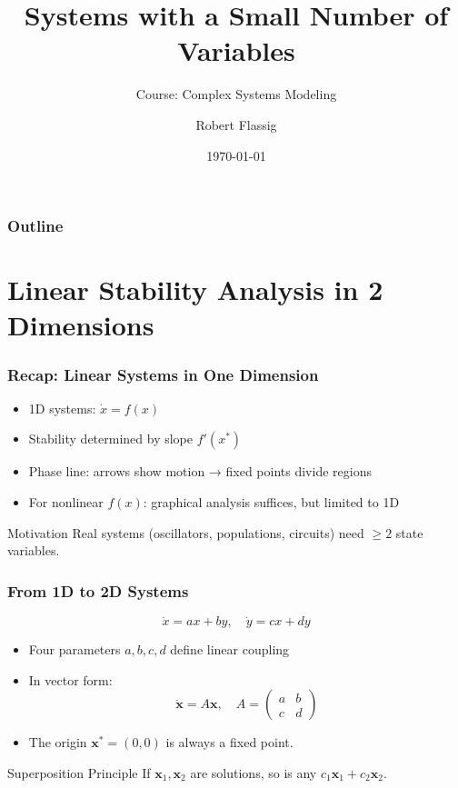 \documentclass{beamer}
\title{Systems with a Small Number of
Variables}
\subtitle{Course: Complex Systems Modeling}
\author{Robert Flassig}
\institute{Brandenburg University of Applied Sciences}
\date{\today}
\begin{document}
\begin{frame}
\titlepage
\end{frame}

\begin{frame}
\frametitle{Outline}
\tableofcontents
\end{frame}

\section{Linear Stability Analysis in 2 Dimensions}

\begin{frame}
  \frametitle{Recap: Linear Systems in One Dimension}
  \begin{itemize}
    \item 1D systems: \(\dot{x} = f(x)\)
    \item Stability determined by slope \(f'(x^*)\)
    \item Phase line: arrows show motion → fixed points divide regions
    \item For nonlinear \(f(x)\): graphical analysis suffices, but limited to 1D
  \end{itemize}
  \begin{block}{Motivation}
    Real systems (oscillators, populations, circuits) need \(\ge 2\) state variables.
  \end{block}
\end{frame}

\begin{frame}
  \frametitle{From 1D to 2D Systems}
  \[
  \dot{x} = a x + b y,\quad \dot{y} = c x + d y
  \]
  \begin{itemize}
    \item Four parameters \(a,b,c,d\) define linear coupling
    \item In vector form:
    \[
    \dot{\mathbf{x}} = A \mathbf{x}, \quad
    A = \begin{pmatrix} a & b \\ c & d \end{pmatrix}
    \]
    \item The origin \(\mathbf{x}^* = (0,0)\) is always a fixed point.
  \end{itemize}
  \begin{block}{Superposition Principle}
    If \(\mathbf{x}_1,\mathbf{x}_2\) are solutions, so is any \(c_1\mathbf{x}_1 + c_2\mathbf{x}_2\).
  \end{block}
\end{frame}
\end{document}
